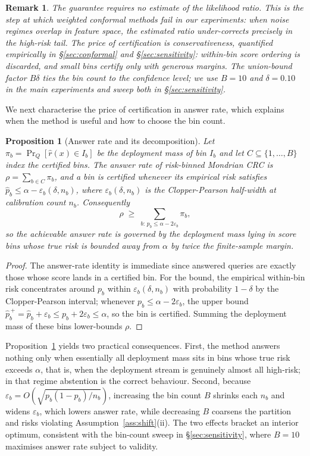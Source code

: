 \documentclass[sn-basic]{sn-jnl}
\theoremstyle{thmstyleone}
\newtheorem{proposition}{Proposition}
\theoremstyle{thmstyletwo}
\newtheorem{remark}{Remark}
\begin{document}
\begin{remark}
The guarantee requires no estimate of the likelihood ratio. This is the
step at which weighted conformal methods fail in our experiments: when
noise regimes overlap in feature space, the estimated ratio
under-corrects precisely in the high-risk tail. The price of
certification is conservativeness, quantified empirically in
\S\ref{sec:conformal} and \S\ref{sec:sensitivity}: within-bin score
ordering is discarded, and small bins certify only with generous
margins. The union-bound factor $B\delta$ ties the bin count to the
confidence level; we use $B = 10$ and $\delta = 0.10$ in the main
experiments and sweep both in \S\ref{sec:sensitivity}.
\end{remark}

We next characterise the price of certification in answer rate, which
explains when the method is useful and how to choose the bin count.

\begin{proposition}[Answer rate and its decomposition]\label{prop:eff}
Let $\pi_b = \Pr_Q[\hat r(x) \in I_b]$ be the deployment mass of bin
$I_b$ and let $C \subseteq \{1, \dots, B\}$ index the certified bins.
The answer rate of risk-binned Mondrian CRC is
$\rho = \sum_{b \in C} \pi_b$, and a bin is certified whenever its
empirical risk satisfies
$\widehat p_b \le \alpha - \varepsilon_b(\delta, n_b)$, where
$\varepsilon_b(\delta, n_b)$ is the Clopper-Pearson half-width at
calibration count $n_b$. Consequently
\[
\rho \;\ge\; \sum_{b:\, p_b \le \alpha - 2\varepsilon_b} \pi_b ,
\]
so the achievable answer rate is governed by the deployment mass lying
in score bins whose true risk is bounded away from $\alpha$ by twice
the finite-sample margin.
\end{proposition}

\begin{proof}
The answer-rate identity is immediate since answered queries are exactly
those whose score lands in a certified bin. For the bound, the empirical
within-bin risk concentrates around $p_b$ within
$\varepsilon_b(\delta, n_b)$ with probability $1 - \delta$ by the
Clopper-Pearson interval; whenever $p_b \le \alpha - 2\varepsilon_b$,
the upper bound $\widehat p^{\,+}_b = \widehat p_b + \varepsilon_b
\le p_b + 2\varepsilon_b \le \alpha$, so the bin is certified. Summing
the deployment mass of these bins lower-bounds $\rho$.
\end{proof}

Proposition~\ref{prop:eff} yields two practical consequences. First,
the method answers nothing only when essentially all deployment mass
sits in bins whose true risk exceeds $\alpha$, that is, when the
deployment stream is genuinely almost all high-risk; in that regime
abstention is the correct behaviour. Second, because
$\varepsilon_b = O(\sqrt{p_b(1 - p_b)/n_b})$, increasing the bin count
$B$ shrinks each $n_b$ and widens $\varepsilon_b$, which lowers answer
rate, while decreasing $B$ coarsens the partition and risks violating
Assumption~\ref{ass:shift}(ii). The two effects bracket an interior
optimum, consistent with the bin-count sweep in
\S\ref{sec:sensitivity}, where $B = 10$ maximises answer rate subject
to validity.
\end{document}
